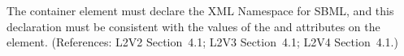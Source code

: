 The  container element must declare the XML Namespace
for SBML, and this declaration must be consistent with the values
of the  and  attributes on the 
 element.  (References: L2V2 Section~4.1;
L2V3 Section~4.1; L2V4 Section~4.1.)
